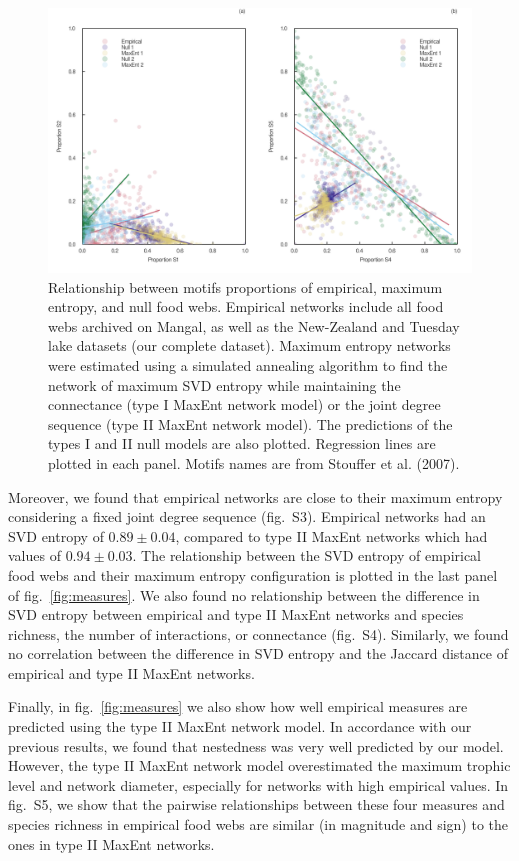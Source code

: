 \documentclass[11pt]{article}
\makeatletter
\def\maxwidth{\ifdim\Gin@nat@width>\linewidth\linewidth
\else\Gin@nat@width\fi}
\let\Oldincludegraphics\includegraphics
\renewcommand{\includegraphics}[1]{\Oldincludegraphics[width=\maxwidth]{#1}}
\makeatother
\begin{document}
\begin{figure}
\hypertarget{fig:motifs_rel}{%
\centering
\includegraphics{figures/motifs_relations.png}
\caption{Relationship between motifs proportions of empirical, maximum
entropy, and null food webs. Empirical networks include all food webs
archived on Mangal, as well as the New-Zealand and Tuesday lake datasets
(our complete dataset). Maximum entropy networks were estimated using a
simulated annealing algorithm to find the network of maximum SVD entropy
while maintaining the connectance (type I MaxEnt network model) or the
joint degree sequence (type II MaxEnt network model). The predictions of
the types I and II null models are also plotted. Regression lines are
plotted in each panel. Motifs names are from Stouffer et al.
(2007).}\label{fig:motifs_rel}
}
\end{figure}

Moreover, we found that empirical networks are close to their maximum
entropy considering a fixed joint degree sequence (fig.~S3). Empirical
networks had an SVD entropy of \(0.89 \pm 0.04\), compared to type II
MaxEnt networks which had values of \(0.94 \pm 0.03\). The relationship
between the SVD entropy of empirical food webs and their maximum entropy
configuration is plotted in the last panel of fig.~\ref{fig:measures}.
We also found no relationship between the difference in SVD entropy
between empirical and type II MaxEnt networks and species richness, the
number of interactions, or connectance (fig.~S4). Similarly, we found no
correlation between the difference in SVD entropy and the Jaccard
distance of empirical and type II MaxEnt networks.

Finally, in fig.~\ref{fig:measures} we also show how well empirical
measures are predicted using the type II MaxEnt network model. In
accordance with our previous results, we found that nestedness was very
well predicted by our model. However, the type II MaxEnt network model
overestimated the maximum trophic level and network diameter, especially
for networks with high empirical values. In fig.~S5, we show that the
pairwise relationships between these four measures and species richness
in empirical food webs are similar (in magnitude and sign) to the ones
in type II MaxEnt networks.
\end{document}
